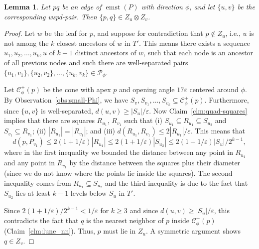 \documentclass[11pt]{paper}
\newcommand {\eps} {\varepsilon}
\DeclareMathOperator {\emst}{emst}
\newtheorem {lem}[theorem] {Lemma}
\begin{document}
\begin{lem}\label{lem:constant-levels}
Let $pq$ be an edge of $\emst(P)$ with direction $\phi$, and let
$\{u,v\}$ be the corresponding wspd-pair.
Then $\{p,q\} \in Z_u \otimes Z_v$.
\end{lem}

\begin{proof}
Let $w$ be the leaf for $p$, and suppose for contradiction
that $p \notin Z_u$, i.e., $u$ is not among the  $k$ closest
ancestors of $w$ in $T'$.
This means there exists a
sequence
$u_1, u_2, \ldots, u_k, u$ of $k+1$ distinct ancestors of $w$,
such that each node is an ancestor of all previous nodes and such
there are well-separated
pairs $\{u_1, v_1\}, \{u_2, v_2\}, \ldots, \{u_k, v_k\} \in \mathcal{P}_\phi$.


Let $\mathcal{C}^+_{\phi}(p)$ be the cone with apex $p$ and opening angle
$17\eps$ centered around $\phi$.  By Observation~\ref{obs:small-Phi},
we have $S_v, S_{v_1}, \ldots, S_{v_k} \subseteq \mathcal{C}^+_{\phi}(p)$.
Furthermore, since $\{u, v\}$ is well-separated, 
$d(u, v) \geq |S_u|/\eps$.
Now Claim~\ref{clm:quad-squares} implies that there are
squares $R_{u_1}$, $R_{v_1}$ such that
(i) $S_{u_1} \subseteq R_{u_1} \subseteq S_{u_2}$
and  $S_{v_1} \subseteq R_{v_1}$;
(ii) $|R_{u_1}| = |R_{v_1}|$; and
(iii) $d(R_{u_1}, R_{v_1}) \leq 2|R_{u_1}|/\eps$.
This means that 
\[
d(p, P_{v_1}) \leq 2(1+1/\eps)|R_{u_1}| \leq
2(1+1/\eps)|S_{u_2}| \leq 2(1+1/\eps)|S_u|/2^{k-1},
\]
where in the first inequality we bounded the distance between
any point in $R_{u_1}$ and any point in $R_{v_1}$ by the distance between the
squares plus their diameter (since we do not know where
the points lie inside the squares). The second inequality
comes from $R_{u_1} \subseteq S_{u_2}$ and 
the third inequality is due to the fact that $S_{u_2}$ lies
at least $k-1$ levels below $S_u$ in $T'$.

Since $2(1+1/\eps)/2^{k-1} < 1/\eps$ for $k \geq 3$ and  since
$d(u,v) \geq |S_u|/\eps$,
this contradicts the fact that $q$ is the nearest neighbor
of $p$ inside $\mathcal{C}^+_{\phi}(p)$ (Claim~\ref{clm:lune_nn}). 
Thus, $p$ must lie in $Z_u$.
A symmetric argument shows $q \in Z_v$.
\end{proof}
\end{document}
